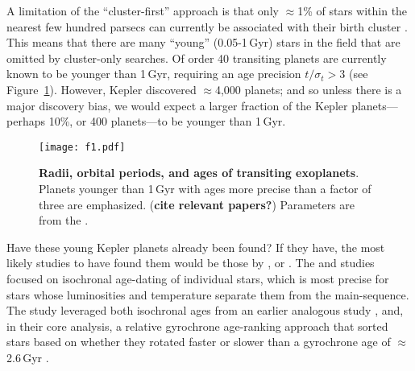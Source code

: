 \documentclass[11pt,twocolumn,tighten]{aastex63}
\begin{document}
A limitation of the ``cluster-first'' approach is that only
$\approx$1\% of stars within the nearest few hundred parsecs can
currently be associated with their birth cluster
\citep[e.g.][]{Zari_2018,CantatGaudin_2020,Kounkel_2020,Kerr_2021}.
This means that there are many ``young'' (0.05-1\,Gyr) stars in the
field that are omitted by cluster-only searches.
Of order 40 transiting planets are currently known to be younger than
1\,Gyr, requiring an age precision $t/\sigma_t > 3$ (see
Figure~\ref{fig:rp_period_age}).  However, Kepler discovered
$\approx$4{,}000 planets; and so unless there is a major discovery
bias, we would expect a larger fraction of the Kepler
planets---perhaps 10\%, or 400 planets---to be younger than 1\,Gyr.

\begin{figure}[!t]
	\begin{center}
		\leavevmode
		\texttt{[image: f1.pdf]}
	\end{center}
	\vspace{-0.6cm}
	\caption{
		{\bf Radii, orbital periods, and ages of transiting exoplanets}.
    Planets younger than 1\,Gyr with ages more precise than a
    factor of three are emphasized. 
    ({\bf cite relevant papers?})
    Parameters are from the \citet{PSCompPars}.
		\label{fig:rp_period_age}
	}
\end{figure}

Have these young Kepler planets already been found?  If they have, the
most likely studies to have found them would be those by
\citet{Berger_2020b_rpage}, \citet{David_2021} or
\citet{Petigura_2022}.  The \citeauthor{Berger_2020b_rpage} and
\citeauthor{Petigura_2022} studies focused on
isochronal age-dating of individual stars, which is most precise 
for stars whose luminosities and temperature separate them from the
main-sequence.  The \citeauthor{David_2021} study leveraged both isochronal
ages from an earlier analogous study
\citep{Fulton_Petigura_2018_cks_vii}, and, in their core analysis, a
relative gyrochrone age-ranking approach that sorted stars based on
whether they rotated faster or slower than a gyrochrone age of
$\approx$2.6\,Gyr \citep{Meibom_2015,Curtis_2020}.
\end{document}
